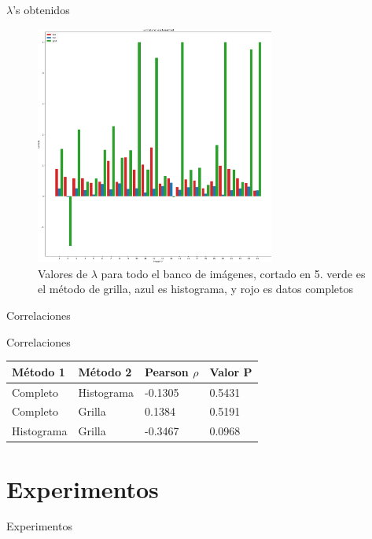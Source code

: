 \documentclass{beamer}
\begin{document}
\begin{frame}{$\lambda$'s obtenidos}
    \begin{figure}[H]
        \centering
        \includegraphics[width=0.7\textwidth]{lambda_clip.png}
        \caption{Valores de $\lambda$ para todo el banco de im\'agenes, cortado en 5. verde es el m\'etodo de grilla, azul es histograma, y rojo es datos completos}
        \label{fig:lambda_clip}
    \end{figure}
\end{frame}
\begin{frame}{Correlaciones}
    \begin{block}{Correlaciones}
        
        \begin{table}[H]
            \centering
            \begin{tabular}{|l|l|l|l|}
                \hline
                M\'etodo 1 & M\'etodo 2 & Pearson $\rho$ & Valor P \\ \hline
                Completo                  & Histograma                & -0.1305   & 0.5431  \\ 
                Completo                  & Grilla                    & 0.1384    & 0.5191  \\ 
                Histograma                & Grilla                    & -0.3467   & 0.0968  \\ \hline
            \end{tabular}
        \end{table}
    \end{block}
\end{frame}

\section{Experimentos}
\begin{frame}{Experimentos}
\end{frame}
\end{document}
